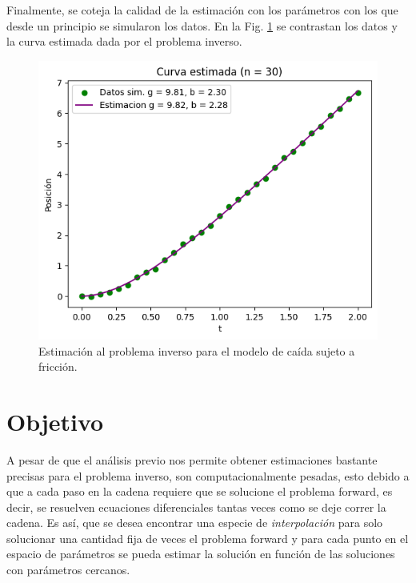 \documentclass{article}
\begin{document}
Finalmente, se coteja la calidad de la estimación con los parámetros con los que desde un principio se simularon los datos. En la Fig. \ref{Fig. 3.05} se contrastan los datos y la curva estimada dada por el problema inverso.

\begin{figure}
    \centering 
    \includegraphics[width = 8 cm]{Figures/estimacion.png} 
    \caption{Estimación al problema inverso para el modelo de caída sujeto a fricción.}
    \label{Fig. 3.05}
\end{figure} 


\section{Objetivo}

A pesar de que el análisis previo nos permite obtener estimaciones bastante precisas para el problema inverso, son computacionalmente pesadas, esto debido a que a cada paso en la cadena requiere que se solucione el problema forward, es decir, se resuelven ecuaciones diferenciales tantas veces como se deje correr la cadena. Es así, que se desea encontrar una especie de \textit{interpolación} para solo solucionar una cantidad fija de veces el problema forward y para cada punto en el espacio de parámetros se pueda estimar la solución en función de las soluciones con parámetros cercanos. 
\end{document}
